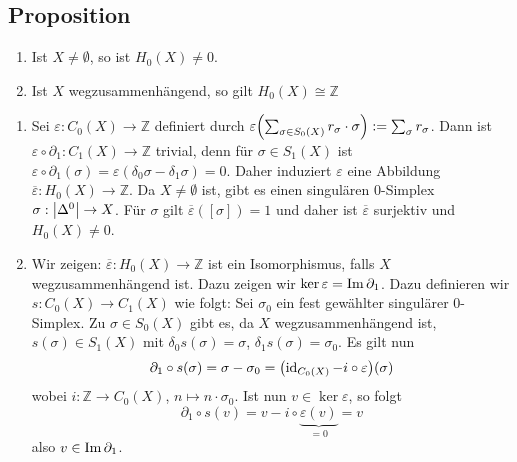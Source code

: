 \subsection[Proposition: Eigenschaften von $H_0(X)$ für $X \not= \emptyset$ und $X$ wegzusammenhängend]{Proposition} %
\label{sub:510}
\begin{enumerate}[1)]
	\item Ist $X \not= \emptyset$, so ist $H_0(X) \not=0$.
	\item Ist $X$ wegzusammenhängend, so gilt $H_0(X) \cong \mathds{Z}$
\end{enumerate}
\begin{enumerate}[1)]
	\item Sei $\varepsilon : C_0(X) \to \mathds{Z}$ definiert durch $\varepsilon \enbrace*{\sum_{\sigma \in S_0(X)}r_\sigma \cdot \sigma } := \sum_\sigma r_\sigma$.
	Dann ist $\varepsilon \circ \partial_1 : C_1(X) \to \mathds{Z}$ trivial, denn für $\sigma \in S_1(X)$ ist 
	$\varepsilon \circ \partial_1(\sigma)= \varepsilon(\delta_0 \sigma - \delta_1 \sigma) = 0$.
	Daher induziert $\varepsilon$ eine Abbildung 
	$\overline{\varepsilon} : H_0(X) \to \mathds{Z}$. Da $X \not= \emptyset$ ist, gibt es einen singulären $0$-Simplex $\sigma : \abs*{\Delta^0} \to X$. Für $\sigma$ gilt 
	$\overline{\varepsilon}( [\sigma])=1$ und daher ist $\overline{\varepsilon}$ surjektiv und $H_0(X) \not= 0$.
	\item Wir zeigen: $\overline{\varepsilon} : H_0(X) \to \mathds{Z}$ ist ein Isomorphismus, falls $X$ wegzusammenhängend ist. Dazu zeigen wir 
	$\ker \varepsilon = \im \partial_1$. Dazu definieren wir $s : C_0(X) \to C_1(X)$ wie folgt: Sei $\sigma_0$ ein fest gewählter singulärer $0$-Simplex.
	Zu $\sigma \in S_0(X)$ gibt es, da $X$ wegzusammenhängend ist, $s(\sigma) \in S_1(X)$ mit $\delta_0 s(\sigma)= \sigma$, $\delta_1 s(\sigma)= \sigma_0$.
	Es gilt nun 
	\begin{align*}
		\partial_1 \circ s(\sigma) = \sigma - \sigma_0 = \enbrace*{\id_{C_0(X)} - i \circ \varepsilon }(\sigma)
	\end{align*}
	wobei $i : \mathds{Z} \to C_0(X)$, $n \mapsto n \cdot \sigma_0$. Ist nun $v \in \ker \varepsilon$, so folgt 
	\[
		\partial_1 \circ s(v)= v- i \circ \underbrace{\varepsilon(v)}_{=0} = v
	\]
	also $v \in \im \partial_1$. \bewende
	

\end{enumerate}
